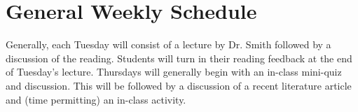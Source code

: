 \documentclass[12pt, notitlepage]{article}   	%
\begin{document}
{\section*{General Weekly Schedule}
Generally, each Tuesday will consist of a lecture by Dr. Smith followed by a discussion
of the reading. Students will turn in their reading
feedback at the end of Tuesday's lecture. Thursdays will generally begin with an in-class
mini-quiz and discussion. 
This will be followed by a discussion of a recent literature article and
(time permitting) an in-class activity.

} %
\end{document}
